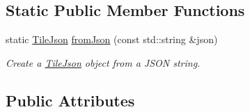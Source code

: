\subsection*{Static Public Member Functions}
\begin{DoxyCompactItemize}
\item 
static \hyperlink{structdg_1_1deepcore_1_1imagery_1_1_tile_json}{Tile\+Json} \hyperlink{group___imagery_module_ga00a8cf6ff58f7d1e46ab5d710efe8e79}{from\+Json} (const std\+::string \&json)
\begin{DoxyCompactList}\small\item\em Create a \hyperlink{structdg_1_1deepcore_1_1imagery_1_1_tile_json}{Tile\+Json} object from a J\+S\+ON string. \end{DoxyCompactList}\end{DoxyCompactItemize}
\subsection*{Public Attributes}

